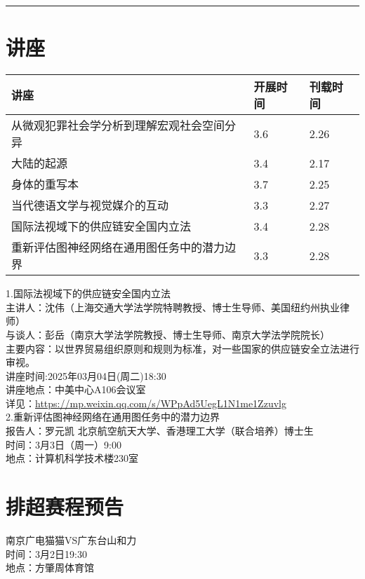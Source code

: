 \documentclass[letterpaper, 12pt]{article}
\begin{document}
\hrule
\pagebreak
\begin{multicols}{2}

\section{讲座}
\begin{tabular}{|>{\centering\arraybackslash}m{}|m{}|m{}|}
    \hline
    讲座 & 开展时间 & 刊载时间\\
    \hline\hline
    从微观犯罪社会学分析到理解宏观社会空间分异   &3.6  &2.26 \\\hline
    大陆的起源 & 3.4 & 2.17\\\hline
    身体的重写本 & 3.7 & 2.25\\\hline
    当代德语文学与视觉媒介的互动 & 3.3 & 2.27\\\hline
    国际法视域下的供应链安全国内立法 & 3.4 & 2.28\\\hline
    重新评估图神经网络在通用图任务中的潜力边界 & 3.3 & 2.28\\\hline
\end{tabular}
1.国际法视域下的供应链安全国内立法\\
主讲人：沈伟（上海交通大学法学院特聘教授、博士生导师、美国纽约州执业律师）\\
与谈人：彭岳（南京大学法学院教授、博士生导师、南京大学法学院院长）\\
主要内容：以世界贸易组织原则和规则为标准，对一些国家的供应链安全立法进行审视。\\
讲座时间:2025年03月04日(周二)18:30\\
讲座地点：中美中心A106会议室\\
详见：\url{https://mp.weixin.qq.com/s/WPpAd5UegL1N1me1Zzuvlg}\\

2.重新评估图神经网络在通用图任务中的潜力边界\\
报告人：罗元凯 北京航空航天大学、香港理工大学（联合培养）博士生\\
时间：3月3日（周一）9:00\\
地点：计算机科学技术楼230室\\

\section{排超赛程预告}
南京广电猫猫VS广东台山和力\\
时间：3月2日19:30\\
地点：方肇周体育馆\\


\end{multicols}
\end{document}
